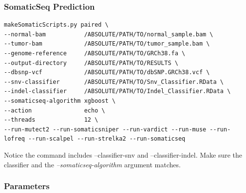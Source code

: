\documentclass[10pt,letterpaper]{article}
\begin{document}
\begin{sloppypar}
\subsubsection{SomaticSeq Prediction}

\begin{lstlisting}
makeSomaticScripts.py paired \
--normal-bam           /ABSOLUTE/PATH/TO/normal_sample.bam \
--tumor-bam            /ABSOLUTE/PATH/TO/tumor_sample.bam \
--genome-reference     /ABSOLUTE/PATH/TO/GRCh38.fa \
--output-directory     /ABSOLUTE/PATH/TO/RESULTS \
--dbsnp-vcf            /ABSOLUTE/PATH/TO/dbSNP.GRCh38.vcf \
--snv-classifier       /ABSOLUTE/PATH/TO/Snv_Classifier.RData \
--indel-classifier     /ABSOLUTE/PATH/TO/Indel_Classifier.RData \
--somaticseq-algorithm xgboost \
--action               echo \
--threads              12 \
--run-mutect2 --run-somaticsniper --run-vardict --run-muse --run-lofreq --run-scalpel --run-strelka2 --run-somaticseq
\end{lstlisting}

Notice the command includes --classifier-snv and --classifier-indel. Make sure the classifier and the \textit{--somaticseq-algorithm} argument matches. 





\subsubsection{Parameters}


\end{sloppypar}
\end{document}

